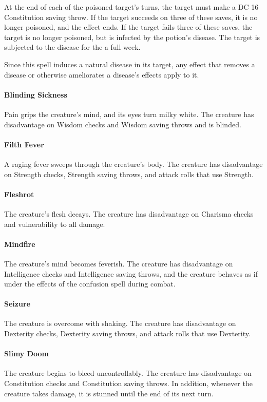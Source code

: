     At the end of each of the poisoned target's turns, the target must make a DC 16 Constitution saving throw.
    If the target succeeds on three of these saves, it is no longer poisoned, and the effect ends.
    If the target fails three of these saves, the target is no longer poisoned, but is infected by the potion's disease.
    The target is subjected to the disease for the a full week.

    Since this spell induces a natural disease in its target, any effect that removes a disease or otherwise ameliorates a disease's effects apply to it.

    \paragraph{Blinding Sickness} Pain grips the creature's mind, and its eyes turn milky white.
    The creature has disadvantage on Wisdom checks and Wisdom saving throws and is blinded.
    \paragraph{Filth Fever} A raging fever sweeps through the creature's body.
    The creature has disadvantage on Strength checks, Strength saving throws, and attack rolls that use Strength.
    \paragraph{Fleshrot} The creature's flesh decays.
    The creature has disadvantage on Charisma checks and vulnerability to all damage.
    \paragraph{Mindfire} The creature's mind becomes feverish.
    The creature has disadvantage on Intelligence checks and Intelligence saving throws, and the creature behaves as if under the effects of the confusion spell during combat.
    \paragraph{Seizure} The creature is overcome with shaking.
    The creature has disadvantage on Dexterity checks, Dexterity saving throws, and attack rolls that use Dexterity.
    \paragraph{Slimy Doom} The creature begins to bleed uncontrollably.
    The creature has disadvantage on Constitution checks and Constitution saving throws.
    In addition, whenever the creature takes damage, it is stunned until the end of its next turn.
